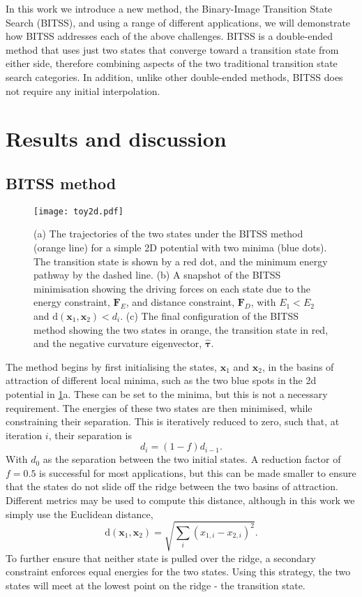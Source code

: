 \documentclass[twocolumn,10pt]{revtex4}
\begin{document}
In this work we introduce a new method, the Binary-Image Transition State Search (BITSS), and using a range of different applications, we will demonstrate how BITSS addresses each of the above challenges.
BITSS is a double-ended method that uses just two states that converge toward a transition state from either side, therefore combining aspects of the two traditional transition state search categories.
In addition, unlike other double-ended methods, BITSS does not require any initial interpolation.


\section{Results and discussion}
\subsection{BITSS method}
\begin{figure}[tb]
  \texttt{[image: toy2d.pdf]}
  \caption{\label{fig:toy2d}
    (a) The trajectories of the two states under the BITSS method (orange line) for a simple 2D potential with two minima (blue dots).
        The transition state is shown by a red dot, and the minimum energy pathway by the dashed line.
    (b) A snapshot of the BITSS minimisation showing the driving forces on each state due to the energy constraint, $\bm{F}_E$, and distance constraint, $\bm{F}_D$, with $E_1 < E_2$ and $\mathrm{d}(\bm{x}_1,\bm{x}_2) < d_i$.
    (c) The final configuration of the BITSS method showing the two states in orange, the transition state in red, and the negative curvature eigenvector, $\bm{\hat{\tau}}$.
  }
\end{figure}

The method begins by first initialising the states, $\bm{x}_1$ and $\bm{x}_2$, in the basins of attraction of different local minima, such as the two blue spots in the 2d potential in \cref{fig:toy2d}a.
These can be set to the minima, but this is not a necessary requirement.
The energies of these two states are then minimised, while constraining their separation.
This is iteratively reduced to zero, such that, at iteration $i$, their separation is
\begin{equation}\label{eq:diteration}
  d_i = (1 - f) d_{i-1}.
\end{equation}
With $d_0$ as the separation between the two initial states.
A reduction factor of $f = 0.5$ is successful for most applications, but this can be made smaller to ensure that the states do not slide off the ridge between the two basins of attraction.
Different metrics may be used to compute this distance, although in this work we simply use the Euclidean distance,
\begin{equation}
  \mathrm{d}(\bm{x}_1, \bm{x}_2) = \sqrt{\sum_i (x_{1,i} - x_{2,i})^2}.
\end{equation}
To further ensure that neither state is pulled over the ridge, a secondary constraint enforces equal energies for the two states.
Using this strategy, the two states will meet at the lowest point on the ridge - the transition state.
\end{document}
